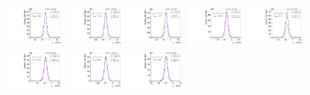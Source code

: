 \begin{figure}[htb]
\includegraphics[width=0.19\textwidth]{plots/Appendix_Recoil_Fits/WmmMC_PF_13TeV_2G/pfu1fit_16.pdf}
\includegraphics[width=0.19\textwidth]{plots/Appendix_Recoil_Fits/WmmMC_PF_13TeV_2G/pfu1fit_17.pdf}
\includegraphics[width=0.19\textwidth]{plots/Appendix_Recoil_Fits/WmmMC_PF_13TeV_2G/pfu1fit_18.pdf}
\includegraphics[width=0.19\textwidth]{plots/Appendix_Recoil_Fits/WmmMC_PF_13TeV_2G/pfu1fit_19.pdf}
\includegraphics[width=0.19\textwidth]{plots/Appendix_Recoil_Fits/WmmMC_PF_13TeV_2G/pfu1fit_21.pdf}
\includegraphics[width=0.19\textwidth]{plots/Appendix_Recoil_Fits/WmmMC_PF_13TeV_2G/pfu1fit_22.pdf}
\includegraphics[width=0.19\textwidth]{plots/Appendix_Recoil_Fits/WmmMC_PF_13TeV_2G/pfu1fit_23.pdf}
\includegraphics[width=0.19\textwidth]{plots/Appendix_Recoil_Fits/WmmMC_PF_13TeV_2G/pfu1fit_24.pdf}

\end{figure}
